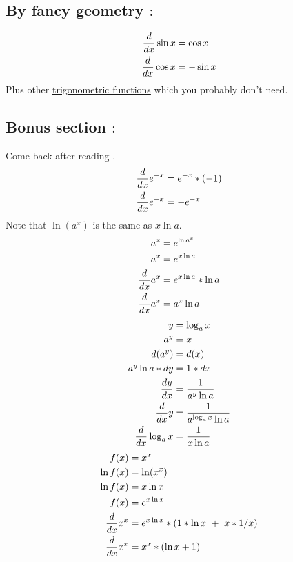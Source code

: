 \documentclass[a4paper,14pt,twoside]{book}
\begin{document}
{\subsection{By fancy geometry $:$}
\begin{align*}
	\frac{d}{dx} \sin{x} & = \cos{x}  \\
	\frac{d}{dx} \cos{x} & = -\sin{x}
\end{align*}
Plus other \href{https://www.priklady.eu/cs/matematika/derivace/derivace-funkce.alej}{trigonometric functions} which you probably don't need.
\subsection{Bonus section $:$}
Come back after reading .
\begin{align*}
	\frac{d}{dx} e^{-x} & = e^{-x} * (-1) \\
	\frac{d}{dx} e^{-x} & = -e^{-x}       \\
\end{align*}
Note that $\ln (a^x)$ is the same as $x \ln a$.
\begin{align*}
	a^x    & = e^{\ln a^x}         \\
	a^x    & = e^{x \ln a}         \\
	\frac{d}{dx} a^x & = e^{x \ln a} * \ln a \\
	\frac{d}{dx} a^x & = a^x \ln a           \\
\end{align*}
\pagebreak
\begin{align*}
	y              & = \log_a{x}                  \\
	a^y            & = x                          \\
	d(a^y)         & = d(x)                       \\
	a^y \ln a * dy & = 1*dx                       \\
	\frac{d y}{d x}      & = \frac{1}{a^y \ln a}           \\
	\frac{d}{dx} y           & = \frac{1}{a^{\log_a{x}} \ln a} \\
	\frac{d}{dx} \log_a{x}   & = \frac{1}{x \ln a}
\end{align*}
\begin{align*}
	f(x)     & = x^x                               \\
	\ln f(x) & = \ln (x^x)                         \\
	\ln f(x) & = x \ln x                           \\
	f(x)     & = e^{x \ln x}                       \\
	\frac{d}{dx} x^x   & = e^{x \ln x} * (1*\ln x\ +\ x*1/x) \\
	\frac{d}{dx} x^x   & = x^x * (\ln x + 1)                 \\
\end{align*}
\pagebreak
}
\end{document}
